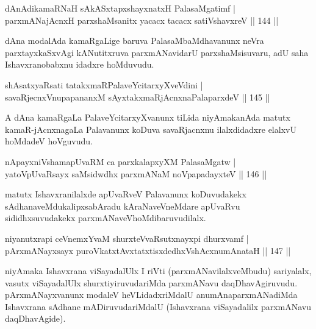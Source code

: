 \begin{shl}
dAnAdikamaRNaH sAkASxtapxshayxnatxH PalasaMgatimf |\\
parxmANajAcnxH parxshaMsanitx yacacx tacacx satiVshavxreV \hfill || 144 ||
\end{shl}

\begin{artha}
dAna modalAda kamaRgaLige baruva PalasaMbaMdhavanunx neVra parxtayxkaSxvAgi kANutitxruva parxmANavidarU parxshaMsisuvaru, adU saha Ishavxranobabxnu idadxre hoMduvudu.
\end{artha}

\begin{shl}
shAsatxyaRsati tatakxmaRPalaveYcitarxyXveVdini |\\
savaRjecnxV\s nupapananxM sAyxtakxmaRjAcnxnaPalaparxdeV \hfill || 145 ||
\end{shl}

\begin{artha}
A dAna kamaRgaLa PalaveYcitarxyXvanunx tiLida niyAmakanAda matutx kamaR-jAcnxnagaLa Palavanunx koDuva savaRjacnxnu ilalxdidadxre elalxvU hoMdadeV hoVguvudu.
\end{artha}


\begin{shl}
nApayxniVshamapUvaRM ca parxkalapxyXM PalasaMgatw |\\
yatoV\s pUvaRsayx saMsidwdhx parxmANaM noVpapadayxteV \hfill || 146 ||
\end{shl}

\begin{artha}
matutx Ishavxranilalxde apUvaRveV Palavanunx koDuvudakekx sAdhanaveMdu\break kalipxsabAradu kAraNaveVneMdare apUvaRvu sididhxsuvudakekx parxmANaveV\break hoMdibaruvudilalx.
\end{artha}

\begin{shl}
niyanutxrapi ceVnemxYvaM shurxteVvaRsutxnayxpi dhurxvamf |\\
pArxmANayxsayx puroVkatxtAvxtatxtisxdedhxVshAcxnumAnataH \hfill || 147 ||
\end{shl}

\begin{artha}%
niyAmaka Ishavxrana viSayadalUlx I riVti (parxmANavilalxveMbudu) sariyalalx, vasutx viSayadalUlx shurxtiyiruvudariMda parxmANavu daqDhavAgiruvudu. pArxmANayxvanunx modaleV heVLidadxriMdalU anumAnaparxmANadiMda Ishavxrana sAdhane mADiruvudariMdalU (Ishavxrana viSayadalilx parxmANavu daqDhavAgide).
\end{artha}


